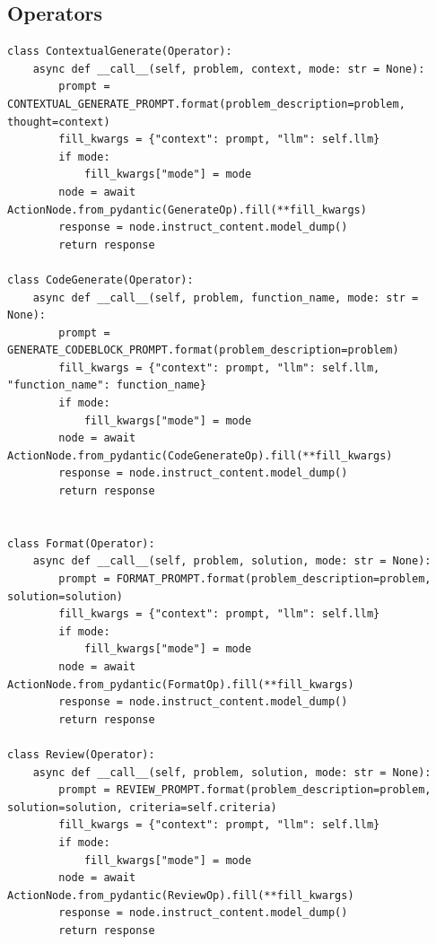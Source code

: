 \documentclass{article} %
\theoremstyle{plain}
\theoremstyle{definition}
\theoremstyle{remark}
\begin{document}
\subsection{Operators}
\label{appendix:operator_code}
\begin{tcolorbox}[title={\textbf{\small Operators}}, boxrule=1pt, arc=0mm, colback=black!5!white, colframe=black!75!white, breakable, before skip=10pt, after skip=10pt, pad at break=2mm, parbox=false] \begin{verbatim}
class ContextualGenerate(Operator):
    async def __call__(self, problem, context, mode: str = None):
        prompt = CONTEXTUAL_GENERATE_PROMPT.format(problem_description=problem, thought=context)
        fill_kwargs = {"context": prompt, "llm": self.llm}
        if mode:
            fill_kwargs["mode"] = mode
        node = await ActionNode.from_pydantic(GenerateOp).fill(**fill_kwargs)
        response = node.instruct_content.model_dump()
        return response

class CodeGenerate(Operator):
    async def __call__(self, problem, function_name, mode: str = None):
        prompt = GENERATE_CODEBLOCK_PROMPT.format(problem_description=problem)
        fill_kwargs = {"context": prompt, "llm": self.llm, "function_name": function_name}
        if mode:
            fill_kwargs["mode"] = mode
        node = await ActionNode.from_pydantic(CodeGenerateOp).fill(**fill_kwargs)
        response = node.instruct_content.model_dump()
        return response


class Format(Operator):
    async def __call__(self, problem, solution, mode: str = None):
        prompt = FORMAT_PROMPT.format(problem_description=problem, solution=solution)
        fill_kwargs = {"context": prompt, "llm": self.llm}
        if mode:
            fill_kwargs["mode"] = mode
        node = await ActionNode.from_pydantic(FormatOp).fill(**fill_kwargs)
        response = node.instruct_content.model_dump()
        return response
        
class Review(Operator):
    async def __call__(self, problem, solution, mode: str = None):
        prompt = REVIEW_PROMPT.format(problem_description=problem, solution=solution, criteria=self.criteria)
        fill_kwargs = {"context": prompt, "llm": self.llm}
        if mode:
            fill_kwargs["mode"] = mode
        node = await ActionNode.from_pydantic(ReviewOp).fill(**fill_kwargs)
        response = node.instruct_content.model_dump()
        return response


\end{verbatim}
\end{tcolorbox}
\end{document}

